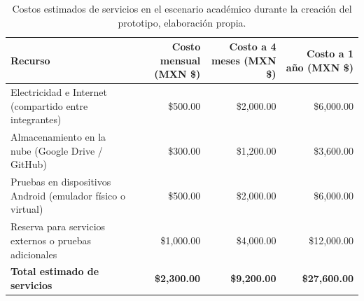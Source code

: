 \begin{table}[H]
	\centering
	\renewcommand{\arraystretch}{1.6}
	\setlength{\tabcolsep}{12pt}
	\Huge %
	\begin{adjustbox}{max width=\textwidth}
		\begin{tabular}{|p{7cm}|r|r|r|}
			\hline
			\textbf{Recurso} & \textbf{Costo mensual (MXN \$)} & \textbf{Costo a 4 meses (MXN \$)} & \textbf{Costo a 1 año (MXN \$)} \\ \hline
			Electricidad e Internet (compartido entre integrantes) & \$500.00 & \$2,000.00 & \$6,000.00 \\ \hline
			Almacenamiento en la nube (Google Drive / GitHub) & \$300.00 & \$1,200.00 & \$3,600.00 \\ \hline
			Pruebas en dispositivos Android (emulador físico o virtual) & \$500.00 & \$2,000.00 & \$6,000.00 \\ \hline
			Reserva para servicios externos o pruebas adicionales & \$1,000.00 & \$4,000.00 & \$12,000.00 \\ \hline
			\textbf{Total estimado de servicios} & \textbf{\$2,300.00} & \textbf{\$9,200.00} & \textbf{\$27,600.00} \\ \hline
		\end{tabular}
	\end{adjustbox}
	\caption[Costos estimados de servicios en el escenario académico durante la creación del prototipo]{Costos estimados de servicios en el escenario académico durante la creación del prototipo, elaboración propia.}
	\label{tab:costos_servicios}
\end{table}



